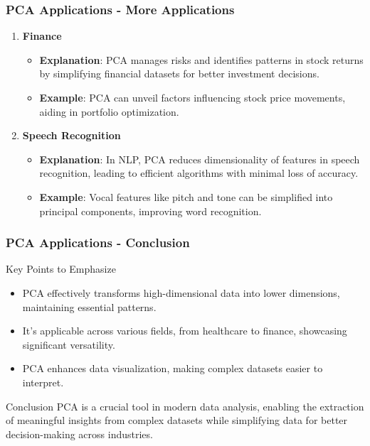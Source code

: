 \documentclass[aspectratio=169]{beamer}
\begin{document}
\begin{frame}[fragile]
    \frametitle{PCA Applications - More Applications}
    \begin{enumerate}[resume]
        \item \textbf{Finance}  
        \begin{itemize}
            \item \textbf{Explanation}: PCA manages risks and identifies patterns in stock returns by simplifying financial datasets for better investment decisions.
            \item \textbf{Example}: PCA can unveil factors influencing stock price movements, aiding in portfolio optimization.
        \end{itemize}

        \item \textbf{Speech Recognition}  
        \begin{itemize}
            \item \textbf{Explanation}: In NLP, PCA reduces dimensionality of features in speech recognition, leading to efficient algorithms with minimal loss of accuracy.
            \item \textbf{Example}: Vocal features like pitch and tone can be simplified into principal components, improving word recognition.
        \end{itemize}
    \end{enumerate}
\end{frame}

\begin{frame}[fragile]
    \frametitle{PCA Applications - Conclusion}
    \begin{block}{Key Points to Emphasize}
        \begin{itemize}
            \item PCA effectively transforms high-dimensional data into lower dimensions, maintaining essential patterns.
            \item It's applicable across various fields, from healthcare to finance, showcasing significant versatility.
            \item PCA enhances data visualization, making complex datasets easier to interpret.
        \end{itemize}
    \end{block}
    
    \begin{block}{Conclusion}
        PCA is a crucial tool in modern data analysis, enabling the extraction of meaningful insights from complex datasets while simplifying data for better decision-making across industries.
    \end{block}
\end{frame}
\end{document}

